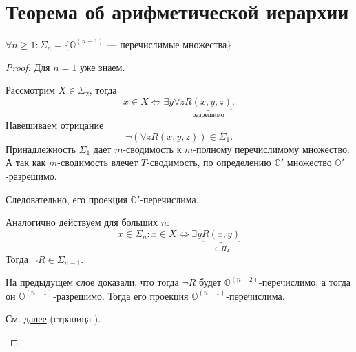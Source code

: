 \section{Теорема об арифметической иерархии}

\begin{thm}\label{thm:main_thm}
	$  \forall n \ge 1 \colon \Sigma _n = \{\mathbb{O}^{(n-1)} \text{ --- перечислимые множества}\}$
\end{thm}
\begin{proof}
    Для $ n = 1$ уже знаем.
	\begin{description}
	    \item \boxed{  \subset } 
			Рассмотрим $ X \in \Sigma _2$, тогда
			\[
				x \in X \Longleftrightarrow \exists y \forall z \underbrace{R(x, y,z)}_{ \text{разрешимо}}
			.\] 
			Навешиваем отрицание
			\[
				\neg \left( \forall z R(x, y, z) \right)  \in \Sigma _1
			.\] 
			Принадлежность $  \Sigma _1$ дает $ m$-сводимость к $ m$-полному перечислимому множество. А так как $ m$-сводимость влечет $ T$-сводимость, по определению $ \mathbb{O}'$ множество  $ \mathbb{O}'$-разрешимо.

			Следовательно, его проекция $ \mathbb{O}'$-перечислима.

			Аналогично действуем для больших  $ n$: 
			\[ x \in \Sigma_n\colon x \in X \Longleftrightarrow \exists y \underbrace{R(x, y)}_{ \in \Pi _2}\]
			Тогда $ \neg R \in \Sigma _{n-1} .$ 

		На предыдущем слое доказали, что тогда $ \neg R $ будет $ \mathbb{O}^{(n-2)}$-перечислимо, а тогда он $ \mathbb{O}^{(n-1)}$-разрешимо. Тогда его проекция $ \mathbb{O}^{(n-1)}$-перечислима.
	    \item \boxed{\supset } 
			См. \hyperref[proof:main_thm]{далее} (страница \pageref{proof:main_thm}).
	\end{description} 
\end{proof}



